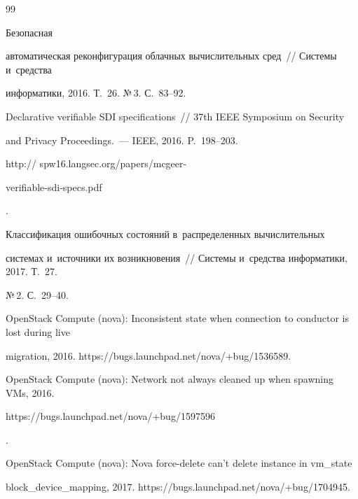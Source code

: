 {\small\frenchspacing


{%




\begin{thebibliography}{99}




 Безопасная 


автоматическая реконфигурация облачных вычислительных сред~/\!\!/ Системы и~средства 


информатики, 2016. Т.~26. №\,3. С.~83--92.




 Declarative verifiable SDI specifications~/\!\!/ 37th IEEE Symposium on Security 


and Privacy Proceedings.~--- IEEE, 2016. P.~198--203. {\sf http:// spw16.langsec.org/papers/mcgeer-


verifiable-sdi-specs.pdf}.







 Классификация ошибочных состояний в~распределенных вычислительных 


системах и~источники их возникновения~/\!\!/ Системы и~средства информатики, 2017. Т.~27. 


№\,2. С.~29--40. 




OpenStack Compute (nova): Inconsistent state when connection to conductor is lost during live 


migration, 2016. {\sf https://bugs.launchpad.net/nova/+bug/1536589}.




OpenStack Compute (nova): Network not always cleaned up when spawning VMs, 2016. {\sf 


https://bugs.launchpad.net/nova/+bug/1597596}. 




OpenStack Compute (nova): Nova force-delete can't delete instance in vm\_state 


block\_device\_mapping, 2017. {\sf https://bugs.launchpad.net/nova/+bug/1704945}. 



\end{thebibliography}}}
